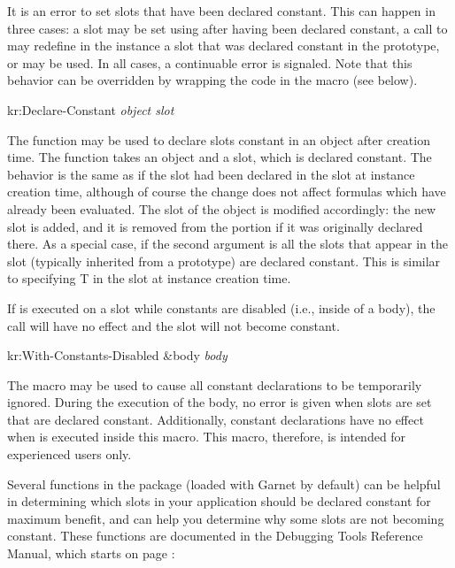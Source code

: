 It is an error to set slots that have been declared constant.  This
can happen in three cases: a slot may be set using  after
having been declared constant, a call to  may
redefine in the instance a slot that was declared constant in the
prototype, or  may be used.  In all cases, a
continuable error is signaled.  Note that
this behavior can be overridden by wrapping the code in the macro
 (see below).


\value{f-top}
\begin{example}
kr:Declare-Constant {\it object slot}\value{function}
\end{example}

The function  may be used to declare slots
constant in an object after creation time.  The function takes an
object and a slot, which is declared constant.  The behavior is the
same as if the slot had been declared in the  slot at
instance creation time, although of course the change does not affect
formulas which have already been evaluated.  The  slot
of the object is modified accordingly: the new slot is added, and it
is removed from the  portion if it was originally declared
there.  As a special case, if the second argument is \value{t} all the
slots that appear in the slot  (typically
inherited from a prototype) are declared constant.  This is similar to
specifying T in the  slot at instance creation time.

If  is executed on a slot while constants are disabled
(i.e., inside of a  body), the call will have no
effect and the slot will not become constant.


\value{f-top}
\begin{example}
kr:With-Constants-Disabled \&body {\it body}\value{macro}
\end{example}

The macro  may be used to cause all
constant declarations to be temporarily ignored.  During the execution
of the body, no error is given when slots are set that are declared
constant.  Additionally, constant declarations have no effect when
 is executed inside this macro.  This macro,
therefore, is intended for experienced users only.

Several functions in the  package (loaded with Garnet by
default) can be helpful in determining which slots in your application should
be declared constant for maximum benefit, and can help you determine why some
slots are not becoming constant.  These functions are documented in the
Debugging Tools Reference Manual, which starts on page \value{debug}:

